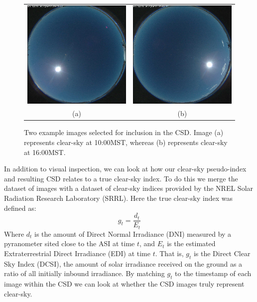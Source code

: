 \documentclass{article}
\begin{document}
\begin{figure}[h]
    \centering
    \begin{tabular}{cc}
    \includegraphics[scale=.5]{Figures/ex1.png} & \includegraphics[scale=.5]{Figures/ex2.png} &\\
    (a) & (b) \\
    \end{tabular}
    \caption{Two example images selected for inclusion in the CSD. Image (a) represents clear-sky at 10:00MST, whereas (b) represents clear-sky at 16:00MST.}
    \label{fig:csd_ex}
\end{figure}

In addition to visual inspection, we can look at how our clear-sky pseudo-index and resulting CSD relates to a true clear-sky index. To do this we merge the dataset of images with a dataset of clear-sky indices provided by the NREL Solar Radiation Research Laboratory (SRRL). Here the true clear-sky index was defined as:
\[
g_{t} = \frac{d_t}{E_t}
\]
Where $d_t$ is the amount of Direct Normal Irradiance (DNI) measured by a pyranometer sited close to the ASI at time $t$, and $E_t$ is the estimated Extraterrestrial Direct Irradiance (EDI) at time $t$. That is, $g_t$ is the Direct Clear Sky Index (DCSI), the amount of solar irradiance received on the ground as a ratio of all initially inbound irradiance. By matching $g_t$ to the timestamp of each image within the CSD we can look at whether the CSD images truly represent clear-sky.
\end{document}
